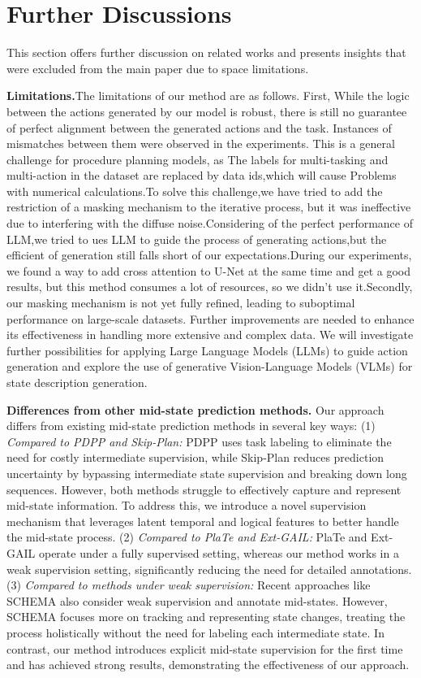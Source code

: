 \section{Further Discussions}
This section offers further discussion on related works and presents insights that were excluded from the main paper due to space limitations.

\textbf{Limitations.}The limitations of our method are as follows. First, While the logic between the actions generated by our model is robust, there is still no guarantee of perfect alignment between the generated actions and the task. Instances of mismatches between them were observed in the experiments. This is a general challenge for procedure planning models, as The labels for multi-tasking and multi-action in the dataset are replaced by data ids,which will cause Problems with numerical calculations.To solve this challenge,we have tried to add the restriction of a masking mechanism to the iterative process, but it was ineffective due to interfering with the diffuse noise.Considering of the perfect performance of LLM,we tried to ues LLM to guide the process of generating actions,but the efficient of generation still falls short of our expectations.During our experiments, we found a way to add cross attention to U-Net at the same time and get a good results, but this method consumes a lot of resources, so we didn't use it.Secondly, our masking mechanism is not yet fully refined, leading to suboptimal performance on large-scale datasets. Further improvements are needed to enhance its effectiveness in handling more extensive and complex data. We will investigate further possibilities for applying Large Language Models (LLMs) to guide action generation and explore the use of generative Vision-Language Models (VLMs) for state description generation.

\textbf{Differences from other mid-state prediction methods.} Our approach differs from existing mid-state prediction methods in several key ways: (1) \textit{Compared to PDPP and Skip-Plan:} PDPP uses task labeling to eliminate the need for costly intermediate supervision, while Skip-Plan reduces prediction uncertainty by bypassing intermediate state supervision and breaking down long sequences. However, both methods struggle to effectively capture and represent mid-state information. To address this, we introduce a novel supervision mechanism that leverages latent temporal and logical features to better handle the mid-state process. (2) \textit{Compared to PlaTe and Ext-GAIL:} PlaTe and Ext-GAIL operate under a fully supervised setting, whereas our method works in a weak supervision setting, significantly reducing the need for detailed annotations. (3) \textit{Compared to methods under weak supervision:} Recent approaches like SCHEMA also consider weak supervision and annotate mid-states. However, SCHEMA focuses more on tracking and representing state changes, treating the process holistically without the need for labeling each intermediate state. In contrast, our method introduces explicit mid-state supervision for the first time and has achieved strong results, demonstrating the effectiveness of our approach.

